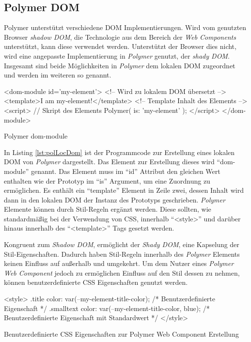 \documentclass[12pt, paper=a4, bibtotoc, toc=listof, headsepline=true]{scrreprt}
\begin{document}
\subsection{Polymer DOM}
Polymer unterstützt verschiedene \ac{DOM} Implementierungen. Wird vom genutzten Browser \emph{shadow DOM}, die Technologie aus dem Bereich der \emph{Web Components} unterstützt, kann diese verwendet werden. Unterstützt der Browser dies nicht, wird eine angepasste Implementierung in \emph{Polymer} genutzt, der \emph{shady DOM}. Insgesamt sind beide Möglichkeiten in \emph{Polymer} dem lokalen \ac{DOM} zugeordnet und werden im weiteren so genannt\cite{polLocDom}.
\begin{listing}
	\begin{HTMLcode*}{}
<dom-module id='my-element'> <!-- Wird zu lokalem DOM übersetzt -->
   <template>I am my-element!</template>  <!-- Template Inhalt des Elements -->
   <script>  // Skript des Elements
      Polymer({
      is: 'my-element'
      });
   </script>
</dom-module>
	\end{HTMLcode*}
	\caption{Polymer dom-module}
	\label{lst:polLocDom}
\end{listing}
In Listing \ref{lst:polLocDom} ist der Programmcode zur Erstellung eines lokalen \ac{DOM} von \emph{Polymer} dargestellt. Das Element zur Erstellung dieses wird \enquote{dom-module} genannt. Das Element muss im \enquote{id} Attribut den gleichen Wert enthalten wie der Prototyp im \enquote{is} Argument, um eine Zuordnung zu ermöglichen. Es enthält ein \enquote{template} Element in Zeile zwei, dessen Inhalt wird dann in den lokalen \ac{DOM} der Instanz des Prototyps geschrieben. \newline
\emph{Polymer} Elemente können durch Stil-Regeln ergänzt werden. Diese sollten, wie standardmäßig bei der Verwendung von \ac{CSS}, innerhalb \enquote{<style>} und darüber hinaus innerhalb des \enquote{<template>} Tags gesetzt werden.

\newline
Kongruent zum \emph{Shadow DOM}, ermöglicht der \emph{Shady DOM}, eine Kapselung der Stil-Eigenschaften. Dadurch haben Stil-Regeln innerhalb des \emph{Polymer} Elements keinen Einfluss auf außerhalb und umgekehrt. Um dem Nutzer eines \emph{Polymer} \emph{Web Component} jedoch zu ermöglichen Einfluss auf den Stil dessen zu nehmen, können benutzerdefinierte \ac{CSS} Eigenschaften genutzt werden\cite{polStyLocDom}.
\begin{listing}
	\begin{HTMLcode*}{}
<style>
.title {
	color: var(--my-element-title-color); /* Benutzerdefinierte Eigenschaft */
}
.smalltext {
	color: var(--my-element-title-color, blue); /* Benutzerdefinierte Eigenschaft mit Standardwert */
}
</style>
	\end{HTMLcode*}
	\caption[Benutzerdefinierte CSS Eigenschaften]{Benutzerdefinierte CSS Eigenschaften zur Polymer Web Component Erstellung}
	\label{lst:benCss}
\end{listing}
\end{document}
